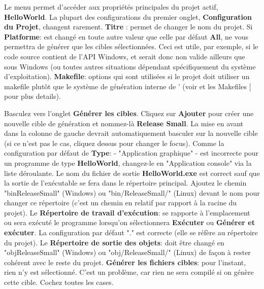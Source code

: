  
Le menu  permet d'accéder aux propriétés principales du projet actif, \textbf{HelloWorld}. La plupart des configurations du premier onglet, \textbf{Configuration du Projet}, changent rarement. \textbf{Titre} : permet de changer le nom du projet. Si \textbf{Platforme}: est changé en toute autre valeur que celle par défaut \textbf{All}, \codeblocks ne vous permettra de générer que les cibles sélectionnées. Ceci est utile, par exemple, si le code source contient de l'API Windows, et serait donc non valide ailleurs que sous Windows (ou toutes autres situations dépendant spécifiquement du système d'exploitation). \textbf{Makefile}: options qui sont utilisées si le projet doit utiliser un makefile plutôt que le système de génération interne de \codeblocks' (voir \codeblocks et les Makefiles [\pxref{sec:cb_makefiles]} pour plus details).


Basculez vers l'onglet \textbf{Générer les cibles}. Cliquez sur \textbf{Ajouter} pour créer une nouvelle cible de génération et nommez-là \textbf{Release Small}. La mise en avant dans la colonne de gauche devrait automatiquement basculer sur la nouvelle cible (si ce n'est pas le cas, cliquez dessus pour changer le focus). Comme la configuration par défaut de \textbf{Type}: - "Application graphique" - est incorrecte pour un programme de type \textbf{HelloWorld}, changez-le en "Application console" via la liste déroulante. Le nom du fichier de sortie \textbf{HelloWorld.exe} est correct sauf que la sortie de l'exécutable se fera dans le répertoire principal. Ajoutez le chemin "bin\osp ReleaseSmall\osp " (Windows) ou "bin/ReleaseSmall/" (Linux) devant le nom pour changer ce répertoire (c'est un chemin en relatif par rapport à la racine du projet). Le \textbf{Répertoire de travail d'exécution}: se rapporte à l'emplacement ou sera exécuté le programme lorsqu'on sélectionnera \textbf{Exécuter} ou \textbf{Générer et exécuter}. La configuration par défaut "." est correcte (elle se réfère au répertoire du projet). Le \textbf{Répertoire de sortie des objets}: doit être changé en "obj\osp ReleaseSmall\osp" (Windows) ou "obj/ReleaseSmall/" (Linux) de façon à rester cohérent avec le reste du projet. \textbf{Générer les fichiers cibles}: pour l'instant, rien n'y est sélectionné. C'est un problème, car rien ne sera compilé si on génère cette cible. Cochez toutes les cases. 

